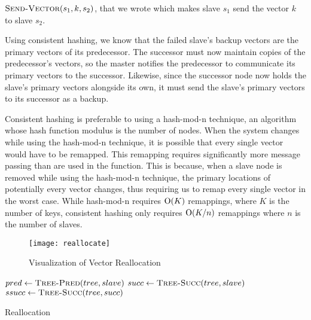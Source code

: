 \(\mathrm{\textsc{Send-Vector}}(s_1, k, s_2)\),
that we wrote which makes slave \(s_1\) send the vector \(k\) to slave \(s_2\).
\par
Using consistent hashing, we know that the failed slave's backup vectors are
the primary vectors of its predecessor. The successor must now maintain copies
of the predecessor's vectors, so the master notifies the predecessor to
communicate its primary vectors to the successor. Likewise, since the successor
node now holds the slave's primary vectors alongside its own, it must send the
slave's primary vectors to its successor as a backup.
\par
Consistent hashing is preferable to using a hash-mod-n technique, an algorithm
whose hash function modulus is the number of nodes. When the system changes
while using the hash-mod-n technique, it is possible that every single vector
would have to be remapped. This remapping requires significantly more message
passing than are used in the  function. This is because,
when a slave node is removed while using the hash-mod-n technique, the primary
locations of potentially every vector changes, thus requiring us to remap every
single vector in the worst case. \cite{kleppmann2017} While hash-mod-n requires
\(\mathrm{O}(K)\) remappings, where \(K\) is the number of keys, consistent
hashing only requires \(\mathrm{O}(K/n)\) remappings where \(n\) is the number of
slaves. \cite{karger1997}
%
\begin{figure}
    \centering
    \texttt{[image: reallocate]}
    \caption{Visualization of Vector Reallocation}
    \label{fig:vector-reallocation}
\end{figure}
%
\begin{algorithm}
    \begin{algorithmic}
            \State $pred \gets \Call{Tree-Pred}{tree, slave}$
            \State $succ \gets \Call{Tree-Succ}{tree, slave}$
            \State $ssucc \gets \Call{Tree-Succ}{tree, succ}$
                \State {}
            \EndFor
                \State {}
            \EndFor
            \State {}
        \EndProcedure
    \end{algorithmic}
    \caption{Reallocation}
    \label{alg:reallocate}
\end{algorithm}
%
